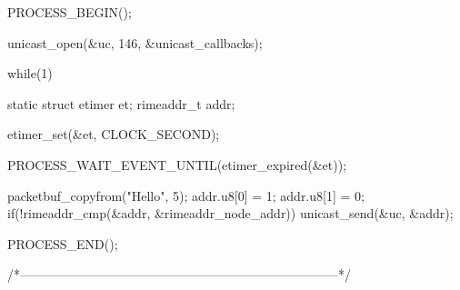 \begin{DoxyCodeInclude}
{  PROCESS_BEGIN();

  unicast_open(&uc, 146, &unicast_callbacks);

  while(1) {
    static struct etimer et;
    rimeaddr_t addr;
    
    etimer_set(&et, CLOCK_SECOND);
    
    PROCESS_WAIT_EVENT_UNTIL(etimer_expired(&et));

    packetbuf_copyfrom("Hello", 5);
    addr.u8[0] = 1;
    addr.u8[1] = 0;
    if(!rimeaddr_cmp(&addr, &rimeaddr_node_addr)) {
      unicast_send(&uc, &addr);
    }

  }

  PROCESS_END();
}
/*---------------------------------------------------------------------------*/
\end{DoxyCodeInclude}
 